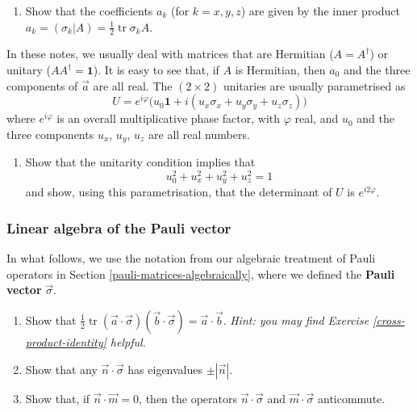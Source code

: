 \documentclass[fleqn]{article}
\providecommand{\tightlist}{%
  \setlength{\itemsep}{0pt}\setlength{\parskip}{0pt}}
\begin{document}
\begin{enumerate}
\def\labelenumi{\arabic{enumi}.}
\tightlist
\item
  Show that the coefficients \(a_k\) (for \(k=x,y,z\)) are given by the inner product \(a_k = (\sigma_k|A) = \frac{1}{2}\operatorname{tr}\sigma_k A\).
\end{enumerate}

In these notes, we usually deal with matrices that are Hermitian (\(A=A^\dagger\)) or unitary (\(AA^\dagger=\mathbf{1}\)).
It is easy to see that, if \(A\) is Hermitian, then \(a_0\) and the three components of \(\vec{a}\) are all real.
The \((2\times 2)\) unitaries are usually parametrised as
\[
  U = e^{i\varphi}\Big(u_0\mathbf{1}+ i(u_x\sigma_x + u_y\sigma_y + u_z\sigma_z)\Big)
\]
where \(e^{i\varphi}\) is an overall multiplicative phase factor, with \(\varphi\) real, and \(u_0\) and the three components \(u_x\), \(u_y\), \(u_z\) are all real numbers.

\begin{enumerate}
\def\labelenumi{\arabic{enumi}.}
\setcounter{enumi}{1}
\tightlist
\item
  Show that the unitarity condition implies that
  \[
     u_0^2 + u_x^2 + u_y^2 + u_z^2 = 1
   \]
  and show, using this parametrisation, that the determinant of \(U\) is \(e^{i2\varphi}\).
\end{enumerate}

\hypertarget{linear-algebra-of-the-pauli-vector}{%
\subsubsection{Linear algebra of the Pauli vector}\label{linear-algebra-of-the-pauli-vector}}

In what follows, we use the notation from our algebraic treatment of Pauli operators in Section \ref{pauli-matrices-algebraically}, where we defined the \textbf{Pauli vector} \(\vec{\sigma}\).

\begin{enumerate}
\def\labelenumi{\arabic{enumi}.}
\item
  Show that \(\frac{1}{2}\operatorname{tr}(\vec{a}\cdot\vec{\sigma})(\vec{b}\cdot\vec{\sigma}) = \vec{a}\cdot\vec{b}\).
  \emph{Hint: you may find Exercise \ref{cross-product-identity} helpful.}
\item
  Show that any \(\vec{n}\cdot\vec{\sigma}\) has eigenvalues \(\pm|\vec{n}|\).
\item
  Show that, if \(\vec{n}\cdot\vec{m}=0\), then the operators \(\vec{n}\cdot\vec{\sigma}\) and \(\vec{m}\cdot\vec{\sigma}\) anticommute.
\end{enumerate}
\end{document}
